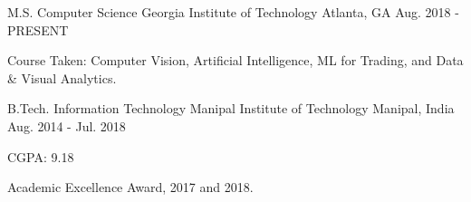 

\begin{cventries}

  \cventry
    {M.S. Computer Science} %
    {Georgia Institute of Technology} %
    {Atlanta, GA} %
    {Aug. 2018 - PRESENT} %
    {
    	\begin{cvitems} %
  		  \item Course Taken: Computer Vision, Artificial Intelligence, ML for Trading, and Data \& Visual Analytics.
  		\end{cvitems}
    }
    
  \cventry
    {B.Tech. Information Technology} %
    {Manipal Institute of Technology} %
    {Manipal, India} %
    {Aug. 2014 - Jul. 2018} %
    {
      \begin{cvitems} %
			\item {CGPA: 9.18}
	  	\item {Academic Excellence Award, 2017 and 2018.}
      \end{cvitems}
    }

\end{cventries}
